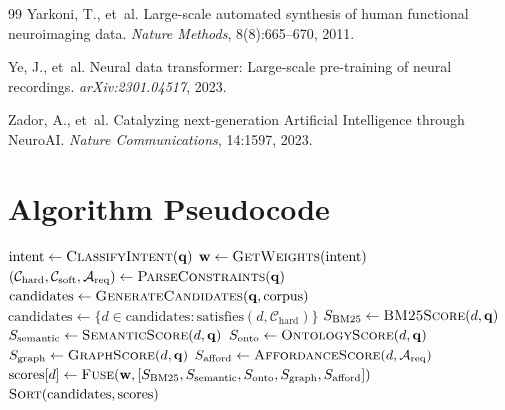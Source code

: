\documentclass{article}
\theoremstyle{definition}
\newcommand{\query}{\mathbf{q}}
\begin{document}
\begin{thebibliography}{99}
Yarkoni, T., et~al.
\newblock Large-scale automated synthesis of human functional neuroimaging data.
\newblock \emph{Nature Methods}, 8(8):665--670, 2011.

Ye, J., et~al.
\newblock Neural data transformer: Large-scale pre-training of neural recordings.
\newblock \emph{arXiv:2301.04517}, 2023.

Zador, A., et~al.
\newblock Catalyzing next-generation Artificial Intelligence through NeuroAI.
\newblock \emph{Nature Communications}, 14:1597, 2023.

\end{thebibliography}

\appendix

\section{Algorithm Pseudocode}
\label{app:algorithms}

\begin{algorithm}[H]
\caption{Neural Search Hybrid Retrieval}
\begin{algorithmic}[1]
\Procedure{Search}{$\query, \text{corpus}, \text{config}$}
    \State $\text{intent} \gets \Call{ClassifyIntent}{\query}$
    \State $\mathbf{w} \gets \Call{GetWeights}{\text{intent}}$
    \State $(\mathcal{C}_{\text{hard}}, \mathcal{C}_{\text{soft}}, \mathcal{A}_{\text{req}}) \gets \Call{ParseConstraints}{\query}$
    \State $\text{candidates} \gets \Call{GenerateCandidates}{\query, \text{corpus}}$
    \State $\text{candidates} \gets \{d \in \text{candidates} : \text{satisfies}(d, \mathcal{C}_{\text{hard}})\}$
        \State $S_{\text{BM25}} \gets \Call{BM25Score}{d, \query}$
        \State $S_{\text{semantic}} \gets \Call{SemanticScore}{d, \query}$
        \State $S_{\text{onto}} \gets \Call{OntologyScore}{d, \query}$
        \State $S_{\text{graph}} \gets \Call{GraphScore}{d, \query}$
        \State $S_{\text{afford}} \gets \Call{AffordanceScore}{d, \mathcal{A}_{\text{req}}}$
        \State $\text{scores}[d] \gets \Call{Fuse}{\mathbf{w}, [S_{\text{BM25}}, S_{\text{semantic}}, S_{\text{onto}}, S_{\text{graph}}, S_{\text{afford}}]}$
    \EndFor
    \State \Return $\Call{Sort}{\text{candidates}, \text{scores}}$
\EndProcedure
\end{algorithmic}
\end{algorithm}
\end{document}
